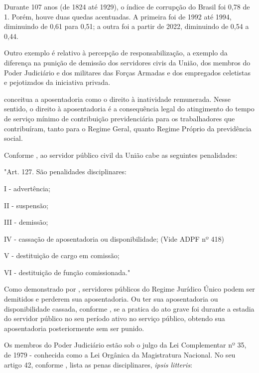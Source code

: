Durante 107 anos (de 1824 até 1929), o índice de corrupção do Brasil foi 0,78 de 1. Porém, houve duas quedas acentuadas. A primeira foi de 1992 até 1994, diminuindo de 0,61 para 0,51; a outra foi a partir de 2022, diminuindo de 0,54 a 0,44.

Outro exemplo é relativo à percepção de responsabilização, a exemplo da diferença na punição de demissão dos servidores civis da União, dos membros do Poder Judiciário e dos militares das Forças Armadas e dos empregados celetistas e pejotizados da iniciativa privada.

\cite{bramante2000desaposentaccao} conceitua a aposentadoria como o direito à inatividade remunerada. Nesse sentido, o direito à aposentadoria é a consequência legal do atingimento do tempo de serviço mínimo de contribuição previdenciária para os trabalhadores que contribuíram, tanto para o Regime Geral, quanto Regime Próprio da previdência social. 

Conforme \cite{l8112}, ao servidor público civil da União cabe as seguintes penalidades:

\noindent
\begin{flushleft}
	\setlength{\leftskip}{4cm}
	\small
	"Art. 127.  São penalidades disciplinares:
	
	I - advertência;
	
	II - suspensão;
	
	III - demissão;
	
	IV - cassação de aposentadoria ou disponibilidade; (Vide ADPF nº 418)
	
	V - destituição de cargo em comissão;
	
	VI - destituição de função comissionada." \cite{l8112}
\end{flushleft}

Como demonstrado por \cite{l8112}, servidores públicos do Regime Jurídico Único podem ser demitidos e perderem sua aposentadoria. Ou ter sua aposentadoria ou disponibilidade cassada, conforme \cite{adpf418}, se a pratica do ato grave foi durante a estadia do servidor público no  seu período ativo no serviço público, obtendo sua aposentadoria posteriormente sem ser punido. 

Os membros do Poder Judiciário estão sob o julgo da Lei Complementar nº 35, de 1979 - conhecida como a Lei Orgânica da Magistratura Nacional. No seu artigo 42, conforme \cite{lcp35}, lista as penas disciplinares, \textit{ipsis litteris}:

